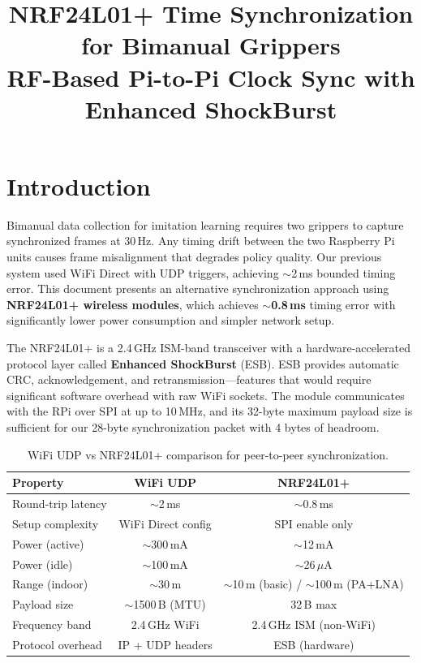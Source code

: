 \documentclass[11pt,a4paper]{article}
\title{\textbf{NRF24L01+ Time Synchronization for Bimanual Grippers}\\[0.3em]
\large RF-Based Pi-to-Pi Clock Sync with Enhanced ShockBurst}
\author{}
\date{}
\begin{document}
\maketitle
\thispagestyle{fancy}
\tableofcontents
\newpage

\section{Introduction}

Bimanual data collection for imitation learning requires two grippers to capture synchronized frames at 30\,Hz. Any timing drift between the two Raspberry Pi units causes frame misalignment that degrades policy quality. Our previous system used WiFi Direct with UDP triggers, achieving ${\sim}$2\,ms bounded timing error. This document presents an alternative synchronization approach using \textbf{NRF24L01+ wireless modules}, which achieves \textbf{${\sim}$0.8\,ms} timing error with significantly lower power consumption and simpler network setup.

The NRF24L01+ is a 2.4\,GHz ISM-band transceiver with a hardware-accelerated protocol layer called \textbf{Enhanced ShockBurst} (ESB). ESB provides automatic CRC, acknowledgement, and retransmission---features that would require significant software overhead with raw WiFi sockets. The module communicates with the RPi over SPI at up to 10\,MHz, and its 32-byte maximum payload size is sufficient for our 28-byte synchronization packet with 4 bytes of headroom.

\begin{table}[htbp]
\centering
\caption{WiFi UDP vs NRF24L01+ comparison for peer-to-peer synchronization.}
\begin{tabular}{l c c}
\toprule
\textbf{Property} & \textbf{WiFi UDP} & \textbf{NRF24L01+} \\
\midrule
Round-trip latency & ${\sim}$2\,ms & ${\sim}$0.8\,ms \\
Setup complexity & WiFi Direct config & SPI enable only \\
Power (active) & ${\sim}$300\,mA & ${\sim}$12\,mA \\
Power (idle) & ${\sim}$100\,mA & ${\sim}$26\,$\mu$A \\
Range (indoor) & ${\sim}$30\,m & ${\sim}$10\,m (basic) / ${\sim}$100\,m (PA+LNA) \\
Payload size & ${\sim}$1500\,B (MTU) & 32\,B max \\
Frequency band & 2.4\,GHz WiFi & 2.4\,GHz ISM (non-WiFi) \\
Protocol overhead & IP + UDP headers & ESB (hardware) \\
\bottomrule
\end{tabular}
\label{tab:wifi-vs-nrf}
\end{table}
\end{document}
